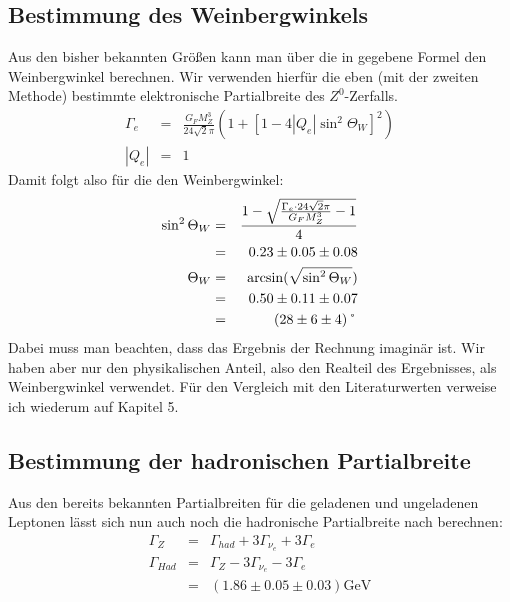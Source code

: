 \subsection{Bestimmung des Weinbergwinkels}
Aus den bisher bekannten Größen kann man über die in \cite[Gl.6]{script} gegebene Formel den Weinbergwinkel berechnen. Wir verwenden hierfür die eben (mit der zweiten Methode) bestimmte elektronische Partialbreite des $Z^0$-Zerfalls.
\begin{eqnarray}
\Gamma_e &=& \frac{G_F M_Z^3}{24 \sqrt{2}\pi}\left(1+[1-4|Q_e|\sin^2\Theta_W]^2\right)\\
|Q_e| &=& 1
\end{eqnarray}
Damit folgt also für die den Weinbergwinkel:
\begin{eqnarray}
\sin^2\Theta_W &=& \frac{1-\sqrt{\frac{\Gamma_e\cdot 24\sqrt{2}\pi}{G_FM_Z^3}-1}}{4}\\
&=& 0.23 \pm 0.05 \pm 0.08\\
\Theta_W &=& \arcsin(\sqrt{\sin^2\Theta_W})\\
&=& 0.50 \pm 0.11 \pm 0.07\\
&=& (28 \pm 6 \pm 4)\symbol{23}
\end{eqnarray}
Dabei muss man beachten, dass das Ergebnis der Rechnung imaginär ist. Wir haben aber nur den physikalischen Anteil, also den Realteil des Ergebnisses, als Weinbergwinkel verwendet. Für den Vergleich mit den Literaturwerten verweise ich wiederum auf Kapitel 5.

\subsection{Bestimmung der hadronischen Partialbreite}
Aus den bereits bekannten Partialbreiten für die geladenen und ungeladenen Leptonen lässt sich nun auch noch die hadronische Partialbreite nach \cite[Gl.8]{script} berechnen:
\begin{eqnarray}
\Gamma_Z &=& \Gamma_{had} + 3\Gamma_{\nu_e} + 3\Gamma_e\\
\Gamma_{Had} &=& \Gamma_Z - 3\Gamma_{\nu_e} - 3\Gamma_e\\
&=& (1.86 \pm 0.05 \pm 0.03)\si{\giga\electronvolt}
\end{eqnarray}

